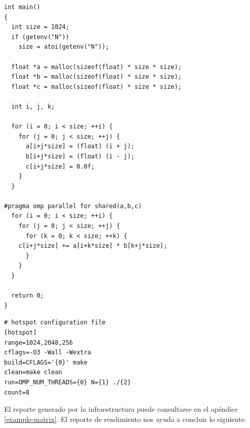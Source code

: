 \documentclass[a4paper]{report}
\begin{document}
\begin{lstlisting}[caption={Código de Multiplicación de Matrices},label={lst:matrix}]
int main()
{
  int size = 1024;
  if (getenv("N"))
    size = atoi(getenv("N"));

  float *a = malloc(sizeof(float) * size * size);
  float *b = malloc(sizeof(float) * size * size);
  float *c = malloc(sizeof(float) * size * size);
  
  int i, j, k;

  for (i = 0; i < size; ++i) {
    for (j = 0; j < size; ++j) {
      a[i+j*size] = (float) (i + j);
      b[i+j*size] = (float) (i - j);
      c[i+j*size] = 0.0f;
    }
  }

#pragma omp parallel for shared(a,b,c) 
  for (i = 0; i < size; ++i) {
    for (j = 0; j < size; ++j) {
      for (k = 0; k < size; ++k) {
	c[i+j*size] += a[i+k*size] * b[k+j*size];
      }
    }
  }

  return 0;
}
\end{lstlisting}

\newpage

\begin{lstlisting}[caption={Caso de Prueba de Multiplicación de Matrices},label={lst:cfg-matrix}]
# hotspot configuration file
[hotspot]
range=1024,2048,256
cflags=-O3 -Wall -Wextra
build=CFLAGS='{0}' make
clean=make clean
run=OMP_NUM_THREADS={0} N={1} ./{2}
count=8
\end{lstlisting}

\bigskip

El reporte generado por la infraestructura puede consultarse en el apéndice \ref{example-matrix}. El reporte de rendimiento nos ayuda a concluir lo siguiente:
\end{document}
